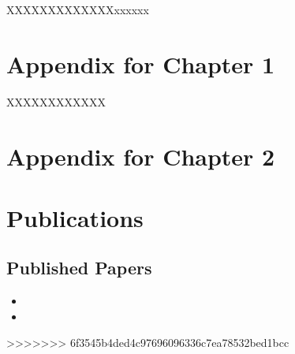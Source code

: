 XXXXXXXXXXXXXxxxxxx



\chapter{Appendix for Chapter 1}

XXXXXXXXXXXX

\chapter{Appendix for Chapter 2}


\chapter{Publications}

\section{Published Papers}

\begin{itemize}
	\item {}
	\item {}
\end{itemize}






>>>>>>> 6f3545b4ded4c97696096336c7ea78532bed1bcc
\outbpdocument{}